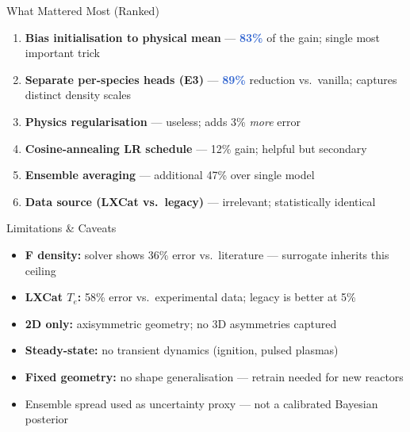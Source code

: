 \documentclass[aspectratio=169]{beamer}
\newcommand{\hlnum}[1]{\textcolor{highlight}{\textbf{#1}}}
\newcommand{\bad}[1]{\textcolor{bad}{#1}}
\begin{document}
\begin{frame}[shrink=5]{What Mattered Most (Ranked)}
\small
\begin{enumerate}\setlength\itemsep{2pt}
    \item \textbf{Bias initialisation to physical mean} --- \hlnum{83\%} of the gain; single most important trick
    \item \textbf{Separate per-species heads (E3)} --- \hlnum{89\%} reduction vs.\ vanilla; captures distinct density scales
    \item \textbf{Physics regularisation} --- \bad{useless}; adds 3\% \emph{more} error
    \item \textbf{Cosine-annealing LR schedule} --- 12\% gain; helpful but secondary
    \item \textbf{Ensemble averaging} --- additional 47\% over single model
    \item \textbf{Data source (LXCat vs.\ legacy)} --- \bad{irrelevant}; statistically identical
\end{enumerate}

\vspace{0.5em}
\centering
{}
\end{frame}

\begin{frame}{Limitations \& Caveats}
\small
\begin{itemize}\setlength\itemsep{2pt}
    \item \textbf{F density:} solver shows \bad{36\% error} vs.\ literature --- surrogate inherits this ceiling
    \item \textbf{LXCat $T_e$:} \bad{58\% error} vs.\ experimental data; legacy is better at 5\%
    \item \textbf{2D only:} axisymmetric geometry; no 3D asymmetries captured
    \item \textbf{Steady-state:} no transient dynamics (ignition, pulsed plasmas)
    \item \textbf{Fixed geometry:} no shape generalisation --- retrain needed for new reactors
    \item Ensemble spread used as uncertainty proxy --- not a calibrated Bayesian posterior
\end{itemize}
\end{frame}
\end{document}
